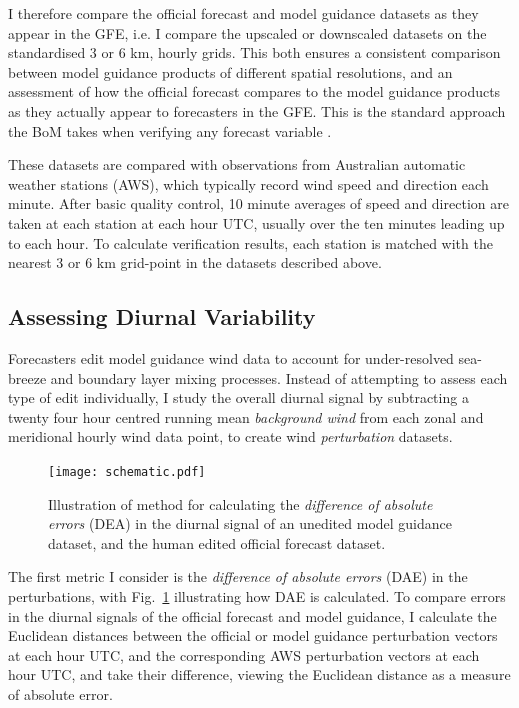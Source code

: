 \documentclass[twocol]{ametsoc}
\begin{document}
I therefore compare the official forecast and model guidance datasets as they appear in the GFE, i.e. I compare the upscaled or downscaled datasets on the standardised 3 or 6 km, hourly grids. This both ensures a consistent comparison between model guidance products of different spatial resolutions, and an assessment of how the official forecast compares to the model guidance products as they actually appear to forecasters in the GFE. This is the standard approach the BoM takes when verifying any forecast variable \citep[e.g.][]{griffiths17}.

These datasets are compared with observations from Australian automatic weather stations (AWS), which typically record wind speed and direction each minute. After basic quality control, 10 minute averages of speed and direction are taken at each station at each hour UTC, usually over the ten minutes leading up to each hour. To calculate verification results, each station is matched with the nearest 3 or 6 km grid-point in the datasets described above.

\subsection{Assessing Diurnal Variability}
Forecasters edit model guidance wind data to account for under-resolved sea-breeze and boundary layer mixing processes. Instead of attempting to assess each type of edit individually, I study the overall diurnal signal by subtracting a twenty four hour centred running mean \textit{background wind} from each zonal and meridional hourly wind data point, to create wind \emph{perturbation} datasets.

\begin{figure}
\centering
\texttt{[image: schematic.pdf]}
\caption{Illustration of method for calculating the \textit{difference of absolute errors} (DEA) in the diurnal signal of an unedited model guidance dataset, and the human edited official forecast dataset.}
\label{Fig:schematic}
\end{figure}

The first metric I consider is the \textit{difference of absolute errors} (DAE) in the perturbations, with Fig.~\ref{Fig:schematic} illustrating how DAE is calculated. To compare errors in the diurnal signals of the official forecast and model guidance, I calculate the Euclidean distances between the official or model guidance perturbation vectors at each hour UTC, and the corresponding AWS perturbation vectors at each hour UTC, and take their difference, viewing the Euclidean distance as a measure of absolute error.
\end{document}
